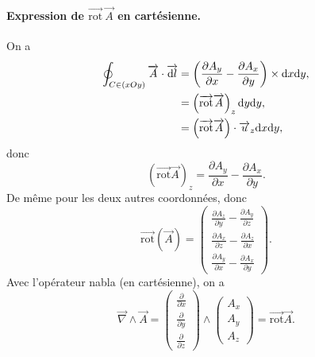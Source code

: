        \paragraph{Expression de $\vec{\mathrm{rot}}~\vec{A}$ en cartésienne.}

            On a 
            \begin{align}
                \oint_{C\in(xOy)}\protect\overrightarrow{{A}}\cdot\protect\overrightarrow{{\mathrm{d} l}}
                &=\left(\frac{\partial A_y}{\partial x}-\frac{\partial A_x}{\partial y}\right)\times\mathrm{d} x\mathrm{d} y,\\
                &=
                \left(\protect\overrightarrow{{\mathrm{rot}}}\protect\overrightarrow{{A}}\right)_{z}\mathrm{d} y\mathrm{d} y,\\
                &=
                \left(\protect\overrightarrow{{\mathrm{rot}}}\protect\overrightarrow{{A}}\right)\cdot\protect\overrightarrow{{u}}_z\mathrm{d} x\mathrm{d} y,
            \end{align}
            donc 
            \begin{equation}
                \boxed{
                    \left(\vec{\mathrm{rot}}\vec{A}\right)_{z}=\frac{\partial A_y}{\partial x}-\frac{\partial A_x}{\partial y}.
                }
            \end{equation}
            De même pour les deux autres coordonnées, donc 
            \begin{equation}
                \boxed{
                    \vec{\mathrm{rot}}(\vec{A})=
                    \begin{pmatrix}
                        \frac{\partial A_z}{\partial y}-\frac{\partial A_y}{\partial z}\\
                        \frac{\partial A_x}{\partial z}-\frac{\partial A_z}{\partial x}\\
                        \frac{\partial A_y}{\partial x}-\frac{\partial A_x}{\partial y}
                    \end{pmatrix}.
                }
            \end{equation}
            Avec l'opérateur nabla (en cartésienne), on a 
            \begin{equation}
                \boxed{
                    \vec{\nabla}\wedge\vec{A}=\begin{pmatrix}
                        \frac{\partial}{\partial x}\\
                        \frac{\partial}{\partial y}\\
                        \frac{\partial}{\partial z}
                    \end{pmatrix}\wedge
                    \begin{pmatrix}
                        A_x\\A_y\\A_z
                    \end{pmatrix}=\vec{\mathrm{rot}}\vec{A}
                }.
            \end{equation}


